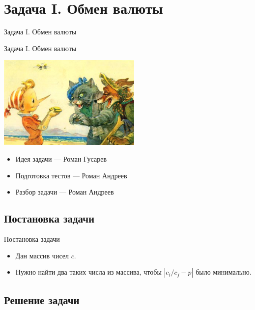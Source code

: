 \section{Задача I. Обмен валюты}

\begin{frame}[t]{Задача I. Обмен валюты}

  \begin{center}
    \LARGE Задача I. Обмен валюты
  \end{center}
  \begin{center}
    \includegraphics[width=7cm]{pics/prices.jpg}
  \end{center}
\end{frame}

\begin{frame}[t]{}
  \vspace{3cm}
  \begin{itemize}
    \item Идея задачи --- Роман Гусарев
    \item Подготовка тестов --- Роман Андреев
    \item Разбор задачи --- Роман Андреев
  \end{itemize}
\end{frame}

\subsection{Постановка задачи}

\begin{frame}[t]{Постановка задачи}
\begin{itemize}
    \item Дан массив чисел $c$.
    \item Нужно найти два таких числа из массива, чтобы $|c_i/c_j - p|$ было минимально.
\end{itemize}
\end{frame}

\subsection{Решение задачи}

